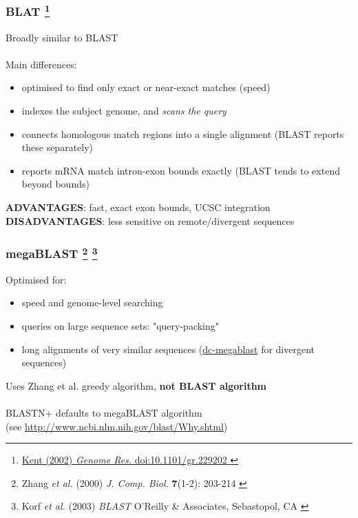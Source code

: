 %
\begin{frame}
  \frametitle{BLAT
  \footnote{\tiny{\href{http://dx.doi.org/10.1101/gr.229202
}{Kent (2002) \textit{Genome Res.} doi:10.1101/gr.229202
}}}
  }
  Broadly similar to BLAST \\~\\
  \textcolor{hutton_blue}{Main differences:}
  \begin{itemize}
    \item optimised to find \textcolor{hutton_purple}{only exact or near-exact matches} (speed)
    \item indexes the subject genome, and \textcolor{hutton_purple}{\textit{scans the query}}
    \item connects homologous match regions into a single alignment (BLAST reports these separately)
    \item reports mRNA match intron-exon bounds exactly (BLAST tends to extend beyond bounds)
  \end{itemize}
  \textcolor{hutton_green}{\textbf{ADVANTAGES}: fast, exact exon bounds, UCSC integration}
  \textcolor{RawSienna}{\textbf{DISADVANTAGES}: less sensitive on remote/divergent sequences}
\end{frame}

%
\begin{frame}
  \frametitle{megaBLAST
  \footnote{\tiny{Zhang \textit{et al.} (2000) \textit{J. Comp. Biol.} \textbf{7}(1-2): 203-214
}}
  \footnote{\tiny{Korf \textit{et al.} (2003) \textit{BLAST} O'Reilly \& Associates, Sebastopol, CA
}}
  }
  Optimised for:
  \begin{itemize}
    \item \textcolor{hutton_green}{speed and genome-level searching}
    \item \textcolor{hutton_blue}{queries on large sequence sets}: "query-packing"
    \item \textcolor{hutton_purple}{long alignments of very similar sequences} (\url{dc-megablast} for divergent sequences)
  \end{itemize}
  Uses Zhang et al. greedy algorithm, \textbf{not BLAST algorithm} \\~\\
  \textcolor{RawSienna}{BLASTN+ defaults to megaBLAST algorithm} \\
  (see \href{http://www.ncbi.nlm.nih.gov/blast/Why.shtml}{http://www.ncbi.nlm.nih.gov/blast/Why.shtml})
\end{frame}

